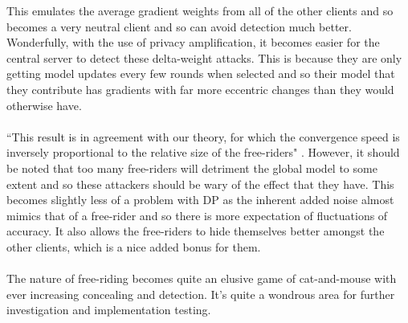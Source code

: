 This emulates the average gradient weights from all of the other clients and so becomes a very neutral client and so can avoid detection much better.
Wonderfully, with the use of privacy amplification, it becomes easier for the central server to detect these delta-weight attacks.
This is because they are only getting model updates every few rounds when selected and so their model that they contribute has gradients with far more eccentric changes than they would otherwise have.
\\ \\
``This result is in agreement with our theory, for which the convergence speed is inversely proportional to the relative size of the free-riders" \cite{free_riding}. 
However, it should be noted that too many free-riders will detriment the global model to some extent and so these attackers should be wary of the effect that they have.
This becomes slightly less of a problem with DP as the inherent added noise almost mimics that of a free-rider and so there is more expectation of fluctuations of accuracy.
It also allows the free-riders to hide themselves better amongst the other clients, which is a nice added bonus for them.
\\ \\
The nature of free-riding becomes quite an elusive game of cat-and-mouse with ever increasing concealing and detection.
It's quite a wondrous area for further investigation and implementation testing.


